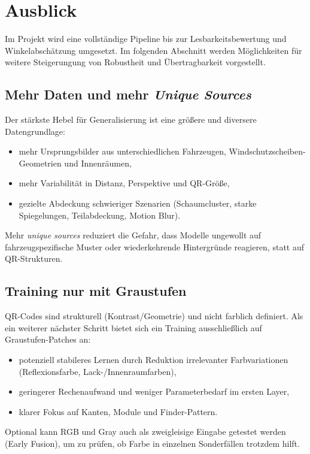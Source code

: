 \section{Ausblick}
Im Projekt wird eine vollständige Pipeline bis zur Lesbarkeitsbewertung und Winkelabschätzung umgesetzt. Im folgenden Abschnitt werden Möglichkeiten für weitere Steigerungung von Robustheit und Übertragbarkeit vorgestellt.

\subsection{Mehr Daten und mehr \textit{Unique Sources}}
Der stärkste Hebel für Generalisierung ist eine größere und diversere Datengrundlage:
\begin{itemize}
    \item mehr Ursprungsbilder aus unterschiedlichen Fahrzeugen, Windschutzscheiben-Geometrien und Innenräumen,
    \item mehr Variabilität in Distanz, Perspektive und \ac{QR}-Größe,
    \item gezielte Abdeckung schwieriger Szenarien (Schaumcluster, starke Spiegelungen, Teilabdeckung, Motion Blur).
\end{itemize}
Mehr \textit{unique sources} reduziert die Gefahr, dass Modelle ungewollt auf fahrzeugspezifische Muster oder wiederkehrende Hintergründe reagieren, statt auf \ac{QR}-Strukturen.

\subsection{Training nur mit Graustufen}
\ac{QR}-Codes sind strukturell (Kontrast/Geometrie) und nicht farblich definiert. Als ein weiterer nächster Schritt bietet sich ein Training ausschließlich auf Graustufen-Patches an:
\begin{itemize}
    \item potenziell stabileres Lernen durch Reduktion irrelevanter Farbvariationen (Reflexionsfarbe, Lack-/Innenraumfarben),
    \item geringerer Rechenaufwand und weniger Parameterbedarf im ersten Layer,
    \item klarer Fokus auf Kanten, Module und Finder-Pattern.
\end{itemize}
Optional kann RGB und Gray auch als zweigleisige Eingabe getestet werden (Early Fusion), um zu prüfen, ob Farbe in einzelnen Sonderfällen trotzdem hilft.

